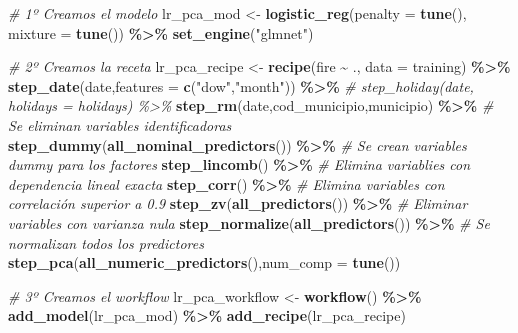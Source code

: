\documentclass[12pt,a4paper,]{book}
\newenvironment{Shaded}{\begin{snugshade}}{\end{snugshade}}
\newcommand{\AttributeTok}[1]{\textcolor[rgb]{0.13,0.29,0.53}{#1}}
\newcommand{\CommentTok}[1]{\textcolor[rgb]{0.56,0.35,0.01}{\textit{#1}}}
\newcommand{\FunctionTok}[1]{\textcolor[rgb]{0.13,0.29,0.53}{\textbf{#1}}}
\newcommand{\NormalTok}[1]{#1}
\newcommand{\OtherTok}[1]{\textcolor[rgb]{0.56,0.35,0.01}{#1}}
\newcommand{\SpecialCharTok}[1]{\textcolor[rgb]{0.81,0.36,0.00}{\textbf{#1}}}
\newcommand{\StringTok}[1]{\textcolor[rgb]{0.31,0.60,0.02}{#1}}
\newcounter{dummy}
\numberwithin{dummy}{section}
\theoremstyle{ocrenumbox}
\theoremstyle{blacknumex}
\theoremstyle{blacknumbox}
\theoremstyle{ocrenum}
\theoremstyle{ocrenum}
\begin{document}
\begin{Shaded}
\begin{Highlighting}[]
\CommentTok{\# 1º Creamos el modelo}
\NormalTok{lr\_pca\_mod }\OtherTok{\textless{}{-}} 
  \FunctionTok{logistic\_reg}\NormalTok{(}\AttributeTok{penalty =} \FunctionTok{tune}\NormalTok{(), }\AttributeTok{mixture =} \FunctionTok{tune}\NormalTok{()) }\SpecialCharTok{\%\textgreater{}\%} 
  \FunctionTok{set\_engine}\NormalTok{(}\StringTok{"glmnet"}\NormalTok{)}


\CommentTok{\# 2º Creamos la receta}
\NormalTok{lr\_pca\_recipe }\OtherTok{\textless{}{-}} 
  \FunctionTok{recipe}\NormalTok{(fire }\SpecialCharTok{\textasciitilde{}}\NormalTok{ ., }\AttributeTok{data =}\NormalTok{ training) }\SpecialCharTok{\%\textgreater{}\%} 
  \FunctionTok{step\_date}\NormalTok{(date,}\AttributeTok{features =} \FunctionTok{c}\NormalTok{(}\StringTok{"dow"}\NormalTok{,}\StringTok{"month"}\NormalTok{)) }\SpecialCharTok{\%\textgreater{}\%} 
  \CommentTok{\# step\_holiday(date, holidays = holidays) \%\textgreater{}\% }
  \FunctionTok{step\_rm}\NormalTok{(date,cod\_municipio,municipio) }\SpecialCharTok{\%\textgreater{}\%} \CommentTok{\# Se eliminan variables identificadoras}
  \FunctionTok{step\_dummy}\NormalTok{(}\FunctionTok{all\_nominal\_predictors}\NormalTok{()) }\SpecialCharTok{\%\textgreater{}\%} \CommentTok{\# Se crean variables dummy para los factores}
  \FunctionTok{step\_lincomb}\NormalTok{() }\SpecialCharTok{\%\textgreater{}\%} \CommentTok{\# Elimina variablies con dependencia lineal exacta}
  \FunctionTok{step\_corr}\NormalTok{() }\SpecialCharTok{\%\textgreater{}\%} \CommentTok{\# Elimina variables con correlación superior a 0.9}
  \FunctionTok{step\_zv}\NormalTok{(}\FunctionTok{all\_predictors}\NormalTok{()) }\SpecialCharTok{\%\textgreater{}\%} \CommentTok{\# Eliminar variables con varianza nula}
  \FunctionTok{step\_normalize}\NormalTok{(}\FunctionTok{all\_predictors}\NormalTok{()) }\SpecialCharTok{\%\textgreater{}\%} \CommentTok{\# Se normalizan todos los predictores}
  \FunctionTok{step\_pca}\NormalTok{(}\FunctionTok{all\_numeric\_predictors}\NormalTok{(),}\AttributeTok{num\_comp =} \FunctionTok{tune}\NormalTok{())}

\CommentTok{\# 3º Creamos el workflow}
\NormalTok{lr\_pca\_workflow }\OtherTok{\textless{}{-}} 
  \FunctionTok{workflow}\NormalTok{() }\SpecialCharTok{\%\textgreater{}\%} 
  \FunctionTok{add\_model}\NormalTok{(lr\_pca\_mod) }\SpecialCharTok{\%\textgreater{}\%} 
  \FunctionTok{add\_recipe}\NormalTok{(lr\_pca\_recipe)}


\end{Highlighting}
\end{Shaded}
\end{document}
